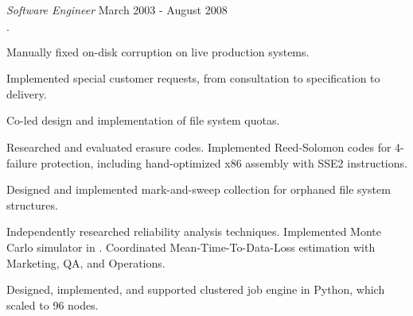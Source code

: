 \documentclass[10pt]{article}
\newenvironment{achievements}{\begin{list}{\bf \Large $\cdot$}{\topsep 2pt \itemsep 0pt}}{\vspace*{4pt}\end{list}}
\begin{document}
  {\em Software Engineer} \hfill March 2003 - August 2008
  \begin{achievements}
  \item Manually fixed on-disk corruption on live production systems.
  \item Implemented special customer requests, from consultation to
    specification to delivery.
  \item Co-led design and implementation of file system quotas.
  \item Researched and evaluated erasure codes.  Implemented Reed-Solomon
    codes for 4-failure protection, including hand-optimized x86 assembly with
    SSE2 instructions.
  \item Designed and implemented mark-and-sweep collection for orphaned file
    system structures.
  \item Independently researched reliability analysis techniques.  Implemented
    Monte Carlo simulator in \cpluspluslogo{}.  Coordinated Mean-Time-To-Data-Loss
    estimation with Marketing, QA, and Operations.
  \item Designed, implemented, and supported clustered job engine in Python,
    which scaled to 96 nodes.
  \end{achievements}

\end{document}
